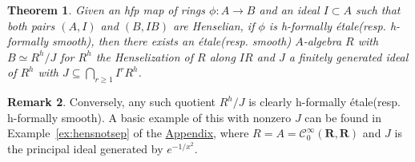 \documentclass[12pt]{article}
\newcommand{\R}{\mathbf{R}}
\newcommand{\mc}[1]{\mathcal{#1}}
\newcommand{\Et}{\'etale\xspace}
\newcommand{\hfp}{hfp\xspace}
\newcommand{\hfetale}{h-formally \'etale\xspace}
\newcommand{\hfsmooth}{h-formally smooth\xspace}
\newtheorem{theorem}{Theorem}[subsection]
\theoremstyle{definition}
\newtheorem{remark}[theorem]{Remark}
\numberwithin{equation}{subsection}
\begin{document}
\begin{theorem}\label{thm:hetale} Given an \hfp map of rings $\phi: A \to B$ and an ideal $I \subset A$ such that both pairs $(A,I)$ and $(B,IB)$ are Henselian, if $\phi$ is \hfetale (resp. \hfsmooth), then there exists an \Et (resp. smooth) $A$-algebra $R$ with $B \simeq R^h/J$ for $R^h$ the Henselization of $R$ along $IR$ and $J$ a finitely generated ideal of $R^h$ with $J \subseteq \bigcap_{r \ge 1} I^rR^h$. \end{theorem}\begin{remark}\label{rmk:quothet} Conversely, any such quotient $R^h/J$ is clearly \hfetale (resp. \hfsmooth). A basic example of this with nonzero $J$ can be found in Example~\ref{ex:hensnotsep} of the \hyperref[sec:appendix]{Appendix}, where $R = A=\mc{C}^\infty_0(\R,\R)$ and $J$ is the principal ideal generated by $e^{-1/x^2}$.
\end{remark}
\end{document}
